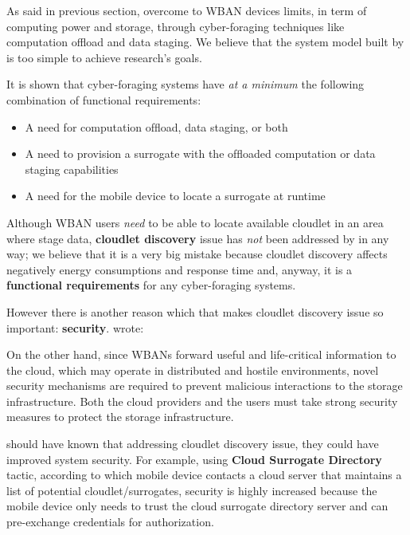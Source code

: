\documentclass[sigchi]{acmart}
\begin{document}
As said in previous section, \citet{MSAReport} overcome to WBAN devices limits, in term of computing power and storage, through cyber-foraging techniques like computation offload and data staging. We believe that the system model built by \citet{MSAReport} is too simple to achieve research's goals.

It is shown \cite{DecisionModel} that cyber-foraging systems have \textit{at a minimum} the following combination of functional requirements:

\begin{itemize}

\item  A need for computation ofﬂoad, data staging, or both
\item  A need to provision a surrogate with the ofﬂoaded computation or data staging capabilities
\item  A need for the mobile device to locate a surrogate at runtime

\end{itemize}

Although WBAN users \textit{need} to be able to locate available cloudlet in an area where stage data, \textbf{cloudlet discovery} issue has \textit{not} been addressed by \citet{MSAReport} in any way; we believe that it is a very big mistake because cloudlet discovery affects negatively energy consumptions and response time and, anyway, it is a \textbf{functional requirements} for any cyber-foraging systems. 

However there is another reason which that makes cloudlet discovery issue so important: \textbf{security}. \citet{MSAReport} wrote:

\vspace{0.3cm}

\begin{quoting}[font=itshape, begintext={``}, endtext={''\cite[par.~3.3]{MSAReport}}]
On the other hand, since WBANs forward useful and life-critical information to the cloud, which may operate in distributed and hostile environments, novel security mechanisms are required to prevent malicious interactions to the storage infrastructure. Both the cloud providers and the users must take strong security measures to protect the storage infrastructure.
\end{quoting}

\vspace{0.3cm}

\citet{MSAReport} should have known that addressing cloudlet discovery issue, they could have improved system security. For example, using \textbf{Cloud Surrogate Directory} tactic, according to which mobile device contacts a cloud server that maintains a list of potential cloudlet/surrogates, security is highly increased because the mobile device only needs to trust the cloud surrogate directory server and can pre-exchange credentials for authorization. 
\end{document}
